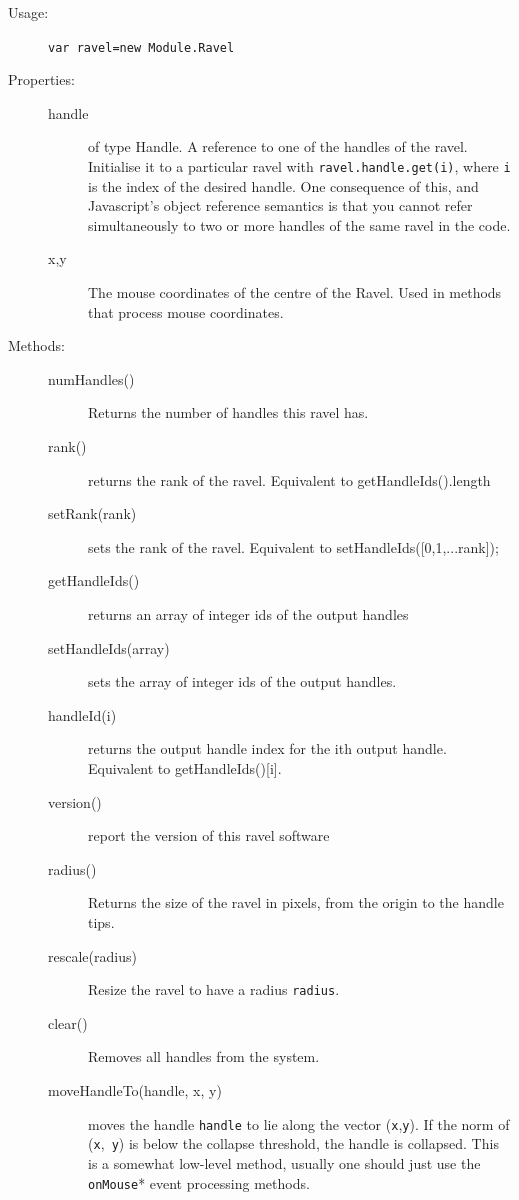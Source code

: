 \documentclass{article}
\begin{document}
\begin{description}
\item[Usage:] \verb+var ravel=new Module.Ravel+
  
\item[Properties:]\mbox{}
  \begin{description}
  \item[handle] of type Handle. A reference to one of the handles of the
    ravel. Initialise it to a particular ravel with
    \verb+ravel.handle.get(i)+, where \verb+i+ is the index of the desired
    handle. One consequence of this, and Javascript's object reference
    semantics is that you cannot refer simultaneously to two or more
    handles of the same ravel in the code.
  \item[x,y] The mouse coordinates of the centre of the Ravel. Used in
    methods that process mouse coordinates.
  \end{description}
  
\item[Methods:]\mbox{}
  \begin{description}
  \item[numHandles()] Returns the number of handles this ravel has.
    
  \item[rank()] returns the rank of the ravel. Equivalent to getHandleIds().length
  \item[setRank(rank)] sets the rank of the ravel. Equivalent to
    setHandleIds([0,1,...rank]);
  \item[getHandleIds()] returns an array of integer ids of the output handles
  \item[setHandleIds(array)] sets the array of integer ids of the output
    handles.
  \item[handleId(i)] returns the output handle index for the ith output
    handle. Equivalent to getHandleIds()[i].
  \item[version()] report the version of this ravel software
  \item[radius()] Returns the size of the ravel in pixels, from the origin
    to the handle tips.
  \item[rescale(radius)] Resize the ravel to have a radius {\tt radius}.
    
  \item[clear()] Removes all handles from the system.
    
  \item[moveHandleTo(handle, x, y)] moves the handle {\tt handle} to
    lie along the vector ({\tt x},{\tt y}). If the norm of ({\tt x},{\tt
      y}) is below the collapse threshold, the handle is collapsed. This is
    a somewhat low-level method, usually one should just use the {\tt
      onMouse}* event processing methods.
    

\end{description}
\end{description}
\end{document}
